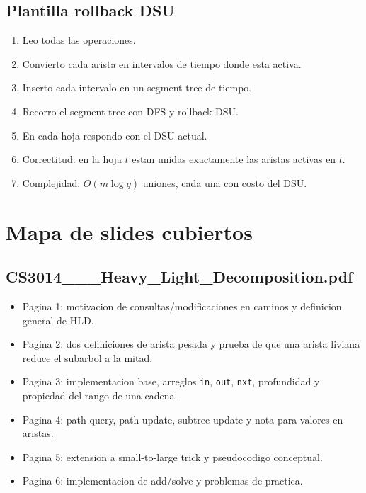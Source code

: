 \documentclass[10pt]{article}
\newcommand{\bigO}{O}
\begin{document}
\subsection{Plantilla rollback DSU}
\begin{enumerate}[leftmargin=*]
\item Leo todas las operaciones.
\item Convierto cada arista en intervalos de tiempo donde esta activa.
\item Inserto cada intervalo en un segment tree de tiempo.
\item Recorro el segment tree con DFS y rollback DSU.
\item En cada hoja respondo con el DSU actual.
\item Correctitud: en la hoja $t$ estan unidas exactamente las aristas activas
en $t$.
\item Complejidad: $\bigO(m\log q)$ uniones, cada una con costo del DSU.
\end{enumerate}

\newpage
\section{Mapa de slides cubiertos}

\subsection*{CS3014\_\_\_Heavy\_Light\_Decomposition.pdf}
\begin{itemize}[leftmargin=*]
\item Pagina 1: motivacion de consultas/modificaciones en caminos y definicion
general de HLD.
\item Pagina 2: dos definiciones de arista pesada y prueba de que una arista
liviana reduce el subarbol a la mitad.
\item Pagina 3: implementacion base, arreglos \texttt{in}, \texttt{out},
\texttt{nxt}, profundidad y propiedad del rango de una cadena.
\item Pagina 4: path query, path update, subtree update y nota para valores en
aristas.
\item Pagina 5: extension a small-to-large trick y pseudocodigo conceptual.
\item Pagina 6: implementacion de add/solve y problemas de practica.
\end{itemize}
\end{document}
